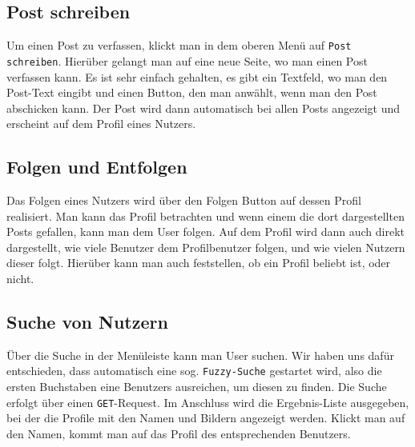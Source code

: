 \subsection{Post schreiben}
Um einen Post zu verfassen, klickt man in dem oberen Menü auf \texttt{Post schreiben}. Hierüber gelangt man auf eine neue Seite, wo man einen Post verfassen kann. Es ist sehr einfach gehalten, es gibt ein Textfeld, wo man den Post-Text eingibt und einen Button, den man anwählt, wenn man den Post abschicken kann. Der Post wird dann automatisch bei allen Posts angezeigt und erscheint auf dem Profil eines Nutzers.

\subsection{Folgen und Entfolgen}
Das Folgen eines Nutzers wird über den Folgen Button auf dessen Profil realisiert. Man kann das Profil betrachten und wenn einem die dort dargestellten Posts gefallen, kann man dem User folgen. Auf dem Profil wird dann auch direkt dargestellt, wie viele Benutzer dem Profilbenutzer folgen, und wie vielen Nutzern dieser folgt. Hierüber kann man auch feststellen, ob ein Profil beliebt ist, oder nicht.

\subsection{Suche von Nutzern}
Über die Suche in der Menüleiste kann man User suchen. Wir haben uns dafür entschieden, dass automatisch eine sog. \texttt{Fuzzy-Suche} gestartet wird, also die ersten Buchstaben eine Benutzers ausreichen, um diesen zu finden. Die Suche erfolgt über einen \texttt{GET}-Request. Im Anschluss wird die Ergebnis-Liste ausgegeben, bei der die Profile mit den Namen und Bildern angezeigt werden. Klickt man auf den Namen, kommt man auf das Profil des entsprechenden Benutzers.
